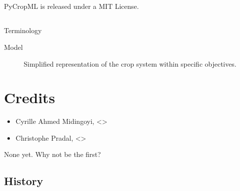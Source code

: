 \documentclass[letterpaper,10pt,english]{sphinxmanual}
\begin{document}
\section{}
\label{\detokenize{user/license::doc}}\label{\detokenize{user/license:licence}}
PyCropML is released under a MIT License.


\section{}
\label{\detokenize{user/Publication:usecases}}\label{\detokenize{user/Publication::doc}}

\section{}
\label{\detokenize{user/glossary:glossary}}\label{\detokenize{user/glossary::doc}}
Terminology
\begin{description}
\item[{Model}] \leavevmode{}\label{\detokenize{user/glossary:term-model}}
Simplified representation of the crop system within specific objectives.

\end{description}


\chapter{Credits}
\label{\detokenize{index:credits}}
\begin{itemize}
\item {} 
Cyrille Ahmed Midingoyi, \textless{}\textgreater{}

\item {} 
Christophe Pradal, \textless{}\textgreater{}

\end{itemize}


None yet. Why not be the first?


\section{History}
\label{\detokenize{index:history}}
\end{document}
